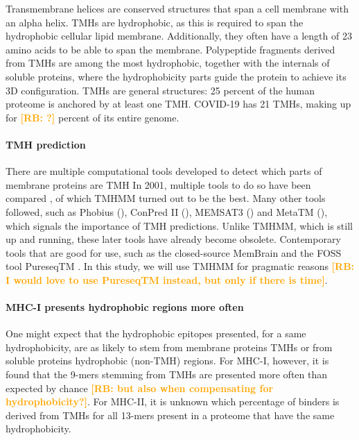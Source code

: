 \documentclass{article}
\newcommand{\richel}[1]{\textcolor{orange}{\textbf{[RB: #1]}}}
\begin{document}
Transmembrane helices are conserved structures that span
a cell membrane with an alpha helix.
TMHs are hydrophobic, as this is required to span the 
hydrophobic cellular lipid membrane. Additionally,
they often have a length of 23 amino acids to be able to span
the membrane.
Polypeptide fragments derived from TMHs are among the most hydrophobic,
together with the internals of soluble proteins, where the
hydrophobicity parts guide the protein to achieve its 3D configuration.
TMHs are general structures: 25 percent of the human proteome is
anchored by at least one TMH. COVID-19 has 21 TMHs, 
making up for \richel{?} percent of its entire genome.

\paragraph{TMH prediction}

There are multiple computational tools developed to detect which
parts of membrane proteins are TMH
In 2001, multiple tools to do so have been compared \cite{moller2001evaluation},
of which TMHMM \cite{krogh2001predicting} turned out to be the best.
Many other tools followed, such as 
Phobius (\cite{kall2004combined}),
ConPred II (\cite{arai2004conpred}),
MEMSAT3 (\cite{jones2007improving})
and MetaTM (\cite{klammer2009metatm}), which signals the importance
of TMH predictions. 
Unlike TMHMM, which is still up and running, 
these later tools have already become obsolete.
Contemporary tools that are good for use, such as
the closed-source MemBrain \cite{feng2020topology} 
and the FOSS tool PureseqTM \cite{wang2019efficient}.
In this study, we will use TMHMM  for pragmatic reasons
\richel{I would love to use PureseqTM instead, but only if there is time}.

\paragraph{MHC-I presents hydrophobic regions more often}

One might expect that the hydrophobic epitopes presented,
for a same hydrophobicity, are as likely to stem from 
membrane proteins TMHs or from soluble proteins hydrophobic (non-TMH) regions.
For MHC-I, however, it is found that the 9-mers stemming
from TMHs are presented more often than expected by 
chance \cite{bianchi2017}
\richel{but also when compensating for hydrophobicity?}.
For MHC-II, it is unknown which percentage of binders 
is derived from TMHs for all 13-mers present in a proteome
that have the same hydrophobicity.
\end{document}
